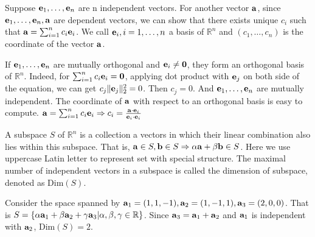 Suppose $\mathbf{e}_1, \dots, \mathbf{e}_n$ are n independent vectors. For another vector $\mathbf{a}$, since
$\mathbf{e}_1, \dots, \mathbf{e}_n, \mathbf{a}$ are dependent vectors, we can show that there exists unique $c_i$ such that
$\mathbf{a} = \sum_{i=1}^n c_i \mathbf{e}_i$. We call $\mathbf{e}_i, i=1,\dots, n$ a basis of $\mathbb{R}^n$ and $(c_1, \dots, c_n)$ is the coordinate of the vector $\mathbf{a}$.

If $\mathbf{e}_1, \dots, \mathbf{e}_n$ are mutually orthogonal and $\mathbf{e}_i \neq \mathbf{0}$, they form an orthogonal basis of $\mathbb{R}^n$. Indeed,  for $\sum_{i=1}^n c_i \mathbf{e}_i = \mathbf{0}$, applying dot product with $\mathbf{e}_j$ on both side of the equation, we can get $ c_j \lVert\mathbf{e}_j\rVert_2^2 = 0 $. Then $c_j = 0$. And $\mathbf{e}_1, \dots, \mathbf{e}_n$ are mutually independent. The coordinate of $\mathbf{a}$ with respect to an orthogonal basis is easy to compute. $\mathbf{a} = \sum_{i=1}^n c_i \mathbf{e}_i \Rightarrow c_i = \frac{\mathbf{a}\cdot \mathbf{e}_i}{\mathbf{e}_i\cdot \mathbf{e}_i}$

A subspace  $S$ of $\mathbb{R}^n$ is a collection a vectors in which their linear combination also lies within this subspace. That is,
$\mathbf{a} \in S, \mathbf{b} \in S \Rightarrow \alpha \mathbf{a} + \beta \mathbf{b} \in S$. Here we use uppercase Latin letter to represent set with special structure.
The maximal number of independent vectors in a subspace is called the dimension of subspace, denoted as $\mathrm{Dim}(S)$.
\begin{example}
Consider the space spanned by $\mathbf{a}_1 = (1,1,-1), \mathbf{a}_2=(1,-1,1), \mathbf{a}_3=(2,0,0)$. That is $S=\{\alpha \mathbf{a}_1 + \beta \mathbf{a}_2 + \gamma \mathbf{a}_3 | \alpha, \beta, \gamma \in \mathbb{R}\}$. Since $\mathbf{a}_3 = \mathbf{a}_1 + \mathbf{a}_2$ and $\mathbf{a}_1$ is independent with $\mathbf{a}_2$, $ \mathrm{Dim}(S) = 2$.
\end{example}
